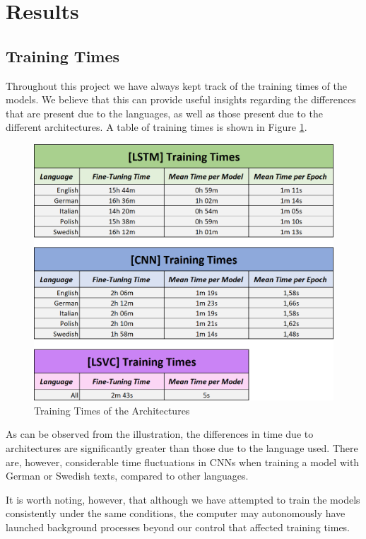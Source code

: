 \documentclass[letterpaper,11pt]{article}
\begin{document}
\section{Results}
\label{sec:results}

\subsection{Training Times}

Throughout this project we have always kept track of the training times of the models. We believe that this can provide useful insights regarding the differences that are present due to the languages, as well as those present due to the different architectures. A table of training times is shown in Figure \ref{fig:training_times}.

\begin{figure}[H]
  \centering
  \includegraphics[width=11.28cm]{fine_tuning_times.png}
  \caption{Training Times of the Architectures}
  \label{fig:training_times}
\end{figure}

As can be observed from the illustration, the differences in time due to architectures are significantly greater than those due to the language used. There are, however, considerable time fluctuations in CNNs when training a model with German or Swedish texts, compared to other languages. 

It is worth noting, however, that although we have attempted to train the models consistently under the same conditions, the computer may autonomously have launched background processes beyond our control that affected training times.
\end{document}
